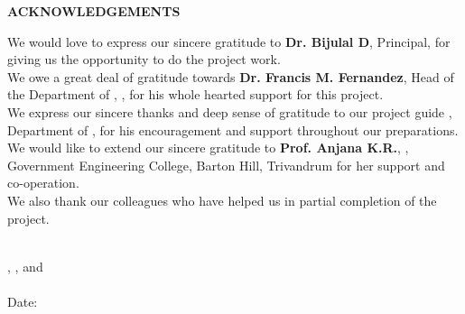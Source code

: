 \thispagestyle{plain}
\begin{center}
 \Large {\bf \uppercase{Acknowledgements}}
\end{center}
\vspace{3\baselineskip}
\justifying
%
%
%
We would love to express our sincere gratitude to 
{\bf Dr. Bijulal D}, Principal,
\University for giving us the opportunity to do the project
work.
\\
 We owe a great deal of gratitude towards {\bf Dr. Francis M. Fernandez}, Head of the Department of \Department, \University, for his whole
hearted support for this project.
\\
 We express our sincere thanks and deep sense of gratitude
to our project guide {\bf \Supervisor}, Department of \Department, for his encouragement and support throughout our preparations.
\\
We would like to extend our sincere gratitude to {\bf Prof. Anjana K.R.}, \Department, Government Engineering College, Barton Hill, Trivandrum for her support and
co-operation.
\\
We also thank our colleagues who have helped us in partial completion of the project.

\centering
\noindent
\vspace{\baselineskip} \\
\textbf{\firstAuthor}, \textbf{\secondAuthor}, \textbf{\thirdAuthor} and \textbf{\fourthAuthor}\\
\University \\
Date: \reportSubmissionDate